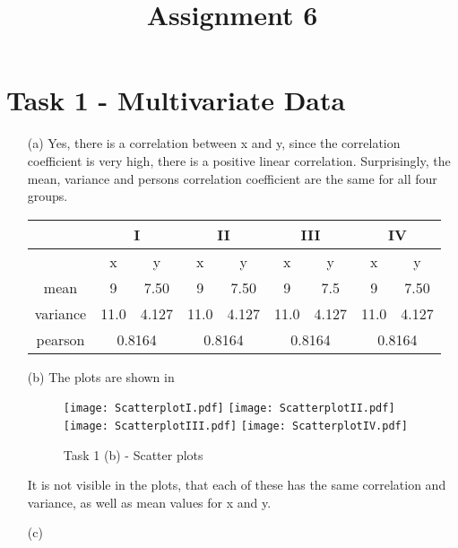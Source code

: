 \documentclass[a4paper]{article}
\date{}
\author{}
\title{\textbf{Assignment 6}}
\begin{document}
\maketitle 
\thispagestyle{fancy}

\section*{Task 1 - Multivariate Data}

\begin{enumerate}
	\item[(a)]
	Yes, there is a correlation between x and y, since the correlation coefficient is very high, there is a positive linear correlation. 
	Surprisingly, the mean, variance and persons correlation coefficient are the same for all four groups. 
	
	
	\begin{tabular}{| c |c c | c c | c c | c c|} \hline
		&\multicolumn{2}{|c|}{I} & \multicolumn{2}{|c|}{II} &
		\multicolumn{2}{c|}{III} & \multicolumn{2}{|c|}{IV} \\ \hline
		&x & y & x & y & x & y & x & y\\ \hline 
		mean & 9 & 7.50 &9 &7.50&9&7.5&9&7.50\\ \hline 
		variance & 11.0 & 4.127 & 11.0 & 4.127  & 11.0 & 4.127 & 11.0 & 4.127 \\ \hline
		pearson & \multicolumn{2}{|c|}{0.8164}  &   \multicolumn{2}{|c|}{0.8164} &  
		 \multicolumn{2}{|c|}{0.8164}  &   \multicolumn{2}{|c|}{0.8164} \\ \hline  
		
	\end{tabular}

	
	\item[(b)] The plots are shown in  \\
	\begin{figure}[h!]
		\texttt{[image: ScatterplotI.pdf]}
		\texttt{[image: ScatterplotII.pdf]}
		\texttt{[image: ScatterplotIII.pdf]}
		\texttt{[image: ScatterplotIV.pdf]}
		\caption{Task 1 (b) - Scatter plots}
		\label{scatterplots}
	\end{figure}
	
	It is not visible in the plots, that each of these has the same correlation and variance, as well as mean values for x and y. 
	
	\item[(c)] 
	
\end{enumerate}
\end{document}

